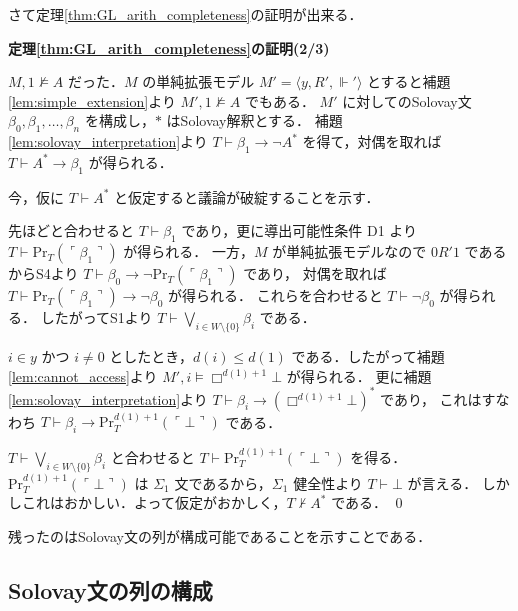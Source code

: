 \documentclass{jsarticle}
\makeatletter
\newcommand*{\Provable}{\mathrm{Pr}}
\newcommand*{\structure}[1]{\langle #1 \rangle}
\theoremstyle{definition}
\renewcommand{\proofname}{証明}
\renewenvironment{proof}[1][\proofname]{\par
    \normalfont 
    \topsep6\p@\@plus6\p@\relax
    \trivlist
    \item\relax
    {\bfseries\gtfamily
    #1\@addpunct{.}}\hspace\labelsep\ignorespaces
    }{%
    \endtrivlist
    \@endpefalse
}
\makeatother
\begin{document}
さて定理\ref{thm:GL_arith_completeness}の証明が出来る．

\begin{proof}[定理\ref{thm:GL_arith_completeness}の証明(2/3)]
	$M,1 \nvDash A$ だった．$M$ の単純拡張モデル $M' = \structure{y, R', \Vdash'}$ とすると補題\ref{lem:simple_extension}より $M',1 \nvDash A$ でもある．
	$M'$ に対してのSolovay文 $\beta_0, \beta_1, \dots, \beta_n$ を構成し，$*$ はSolovay解釈とする．
	補題\ref{lem:solovay_interpretation}より $T \vdash \beta_1 \to \lnot A^*$ を得て，対偶を取れば $T \vdash A^* \to \beta_1$ が得られる．

	今，仮に $T \vdash A^*$ と仮定すると議論が破綻することを示す．

	先ほどと合わせると $T \vdash \beta_1$ であり，更に導出可能性条件 D1 より $T \vdash \Provable_T(\ulcorner \beta_1 \urcorner)$ が得られる．
	一方，$M$ が単純拡張モデルなので $0 R' 1$ であるからS4より $T \vdash \beta_0 \to \lnot \Provable_T(\ulcorner \beta_1 \urcorner)$ であり，
	対偶を取れば $T \vdash \Provable_T(\ulcorner \beta_1 \urcorner) \to \lnot \beta_0$ が得られる．
	これらを合わせると $T \vdash \lnot \beta_0$ が得られる．
	したがってS1より $T \vdash \bigvee_{i \in W \setminus \{0\}} \beta_i$ である．

	$i \in y$ かつ $i \neq 0$ としたとき，$d(i) \leq d(1)$ である．したがって補題 \ref{lem:cannot_access}より
	$M',i \vDash \Box^{d(1) + 1} \bot$ が得られる．
	更に補題\ref{lem:solovay_interpretation}より $T \vdash \beta_i \to (\Box^{d(1) + 1} \bot)^*$ であり，
	これはすなわち $T \vdash \beta_{i} \to \Provable^{d(1) + 1}_T(\ulcorner \bot \urcorner)$ である．

	$T \vdash \bigvee_{i \in W \setminus \{0\}} \beta_i$ と合わせると $T \vdash \Provable^{d(1) + 1}_T(\ulcorner \bot \urcorner)$ を得る．
	$\Provable^{d(1) + 1}_T(\ulcorner \bot \urcorner)$ は $\Sigma_1$ 文であるから，$\Sigma_1$ 健全性より $T \vdash \bot$ が言える．
	しかしこれはおかしい．よって仮定がおかしく，$T \nvdash A^*$ である．
	\qed
\end{proof}

残ったのはSolovay文の列が構成可能であることを示すことである．

\subsection{Solovay文の列の構成}

\printbibliography

\printindex
\end{document}
